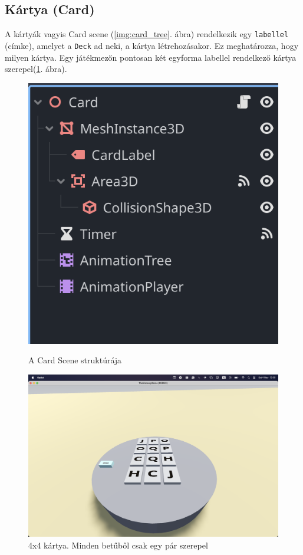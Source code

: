 \subsection{Kártya (Card)}
A kártyák vagyis Card scene (\ref{img:card_tree}. ábra) rendelkezik egy \lstinline|labellel| (címke), amelyet a \lstinline|Deck| ad neki, a kártya létrehozásakor. Ez meghatározza, hogy milyen kártya. 
Egy játékmezőn pontosan két egyforma labellel rendelkező kártya szerepel(\ref{img:cards_has_pairs}. ábra).

\begin{figure}[H]
    \centering
    \begin{minipage}[b]{0.45\textwidth}
        \includegraphics[width=\textwidth]{img/cards_scene_tree.png}
        \caption{A Card Scene struktúrája}
        \label{img:card_tree}
    \end{minipage}
    \hfill
    \begin{minipage}[b]{0.45\textwidth}
        \includegraphics[width=\textwidth]{img/4x4_all_card_fliped.png}
        \caption{4x4 kártya. Minden betűből csak egy pár szerepel}
        \label{img:cards_has_pairs}  
    \end{minipage}
\end{figure}

